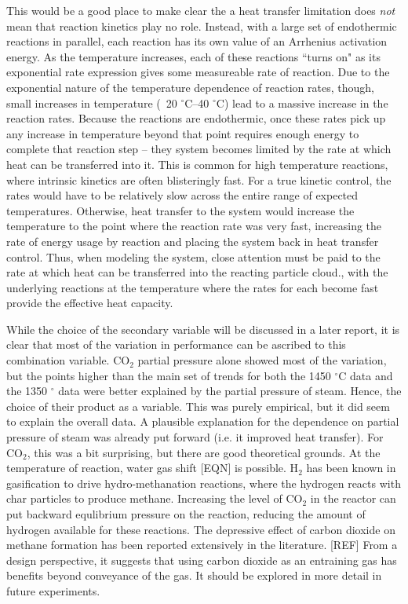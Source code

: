 \documentclass[11pt,twocolumn]{article}
\begin{document}
This would be a good place to make clear the a heat transfer limitation does \emph{not} mean that reaction kinetics play no role.  Instead, with a large set of endothermic reactions in parallel, each reaction has its own value of an Arrhenius activation energy.  As the temperature increases, each of these reactions ``turns on" as its exponential rate expression gives some measureable rate of reaction.  Due to the exponential nature of the temperature dependence of reaction rates, though, small increases in temperature (~20 $^{\circ}$C--40 $^{\circ}$C) lead to a massive increase in the reaction rates.  Because the reactions are endothermic, once these rates pick up any increase in temperature beyond that point requires enough energy to complete that reaction step -- they system becomes limited by the rate at which heat can be transferred into it.  This is common for high temperature reactions, where intrinsic kinetics are often blisteringly fast.  For a true kinetic control, the rates would have to be relatively slow across the entire range of expected temperatures.  Otherwise, heat transfer to the system would increase the temperature to the point where the reaction rate was very fast, increasing the rate of energy usage by reaction and placing the system back in heat transfer control.  Thus, when modeling the system, close attention must be paid to the rate at which heat can be transferred into the reacting particle cloud., with the underlying reactions at the temperature where the rates for each become fast provide the effective heat capacity.

While the choice of the secondary variable will be discussed in a later report, it is clear that most of the variation in performance can be ascribed to this combination variable.  CO$_2$ partial pressure alone showed most of the variation, but the points higher than the main set of trends for both the 1450 $^{\circ}$C data and the 1350 $^{\circ}$ data were better explained by the partial pressure of steam.  Hence, the choice of their product as a variable.  This was purely empirical, but it did seem to explain the overall data.  A plausible explanation for the dependence on partial pressure of steam was already put forward (i.e. it improved heat transfer).  For CO$_2$, this was a bit surprising, but there are good theoretical grounds.  At the temperature of reaction, water gas shift [EQN] is possible.  H$_2$ has been known in gasification to drive hydro-methanation reactions, where the hydrogen reacts with char particles to produce methane.  Increasing the level of CO$_2$ in the reactor can put backward equlibrium pressure on the reaction, reducing the amount of hydrogen available for these reactions.  The depressive effect of carbon dioxide on methane formation has been reported extensively in the literature. [REF]  From a design perspective, it suggests that using carbon dioxide as an entraining gas has benefits beyond conveyance of the gas.  It should be explored in more detail in future experiments.
\end{document}
